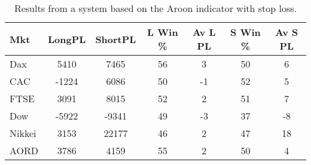 \begin{table}[ht]
\centering
\caption[Results from a system based on the Aroon indicator with stop loss]{Results from a system based on the Aroon indicator with stop loss.} 
\label{tab:aroon_results_sloss}
\begin{tabular}{lcccccc}
  \toprule Mkt & LongPL & ShortPL & L Win \% & Av L PL & S Win \% & Av S PL \\ 
  \midrule Dax & 5410 & 7465 & 56 & 3 & 50 & 6 \\ 
  CAC & -1224 & 6086 & 50 & -1 & 52 & 5 \\ 
  FTSE & 3091 & 8015 & 52 & 2 & 51 & 7 \\ 
  Dow & -5922 & -9341 & 49 & -3 & 37 & -8 \\ 
  Nikkei & 3153 & 22177 & 46 & 2 & 47 & 18 \\ 
  AORD & 3786 & 4159 & 55 & 2 & 50 & 4 \\ 
   \bottomrule \end{tabular}
\end{table}

